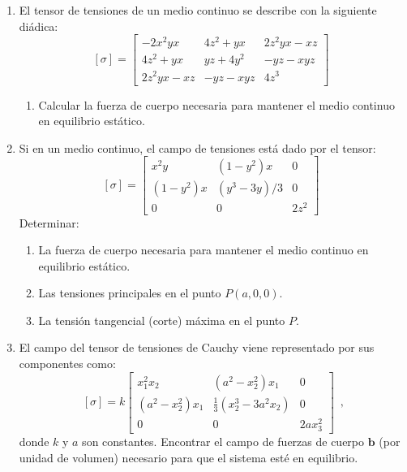 \documentclass[../notas medios.tex]{subfiles}
\begin{document}
\begin{enumerate}
\item \label{punto04} El tensor de tensiones de un medio continuo se describe
con la siguiente di\'adica:
		\[ [\sigma] = \left[ \begin{array}{ccc}
		-2x^2yx & 4z^2+yx & 2z^2yx-xz \\ 
		4z^2+yx & yz+4y^2 & -yz-xyz \\ 
		2z^2yx-xz & -yz-xyz & 4z^3
		\end{array}  \right] \enspace\]
	\begin{enumerate}
		\item Calcular la fuerza de cuerpo necesaria para mantener el medio continuo en equilibrio est\'atico.
	\end{enumerate}
\item \label{punto05} Si en un medio continuo, el campo de tensiones est\'a dado
por el tensor:
		\[ [\sigma] = \left[ \begin{array}{ccc}
		x^2y & (1-y^2)x & 0 \\ 
		(1-y^2)x & (y^3-3y)/3 & 0 \\ 
		0 & 0 & 2z^2
		\end{array}  \right]\enspace \]
	Determinar:
	\begin{enumerate}
		\item La fuerza de cuerpo necesaria para mantener el medio continuo en equilibrio est\'atico.
		\item Las tensiones principales en el punto $P(a,0,0)$.
		\item La tensi\'on tangencial (corte) m\'axima en el punto $P$.
	\end{enumerate}



\item \label{punto07} El campo del tensor de tensiones de Cauchy viene
representado por sus componentes como:
		\[[\sigma] = k\left[ \begin{array}{ccc}
		x_1^2 x_2 & (a^2-x_2^2)x_1 & 0 \\ 
		(a^2-x_2^2)x_1 & \frac{1}{3}(x_2^3 - 3a^2 x_2) & 0 \\ 
		0 & 0 & 2ax_3^2
		\end{array}  \right] \enspace,\]
%	
	donde $k$ y $a$ son constantes.
%
	Encontrar el campo de fuerzas de cuerpo $\mathbf{b}$ (por unidad de volumen) necesario para que el sistema est\'e en equilibrio.
%



\end{enumerate}
\end{document}
